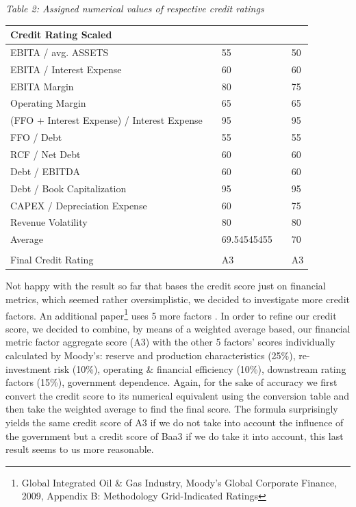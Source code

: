 \documentclass[
]{article}
\begin{document}
\emph{Table 2: Assigned numerical values of respective credit ratings}

\begin{longtable}[]{@{}lllll@{}}
\toprule
Credit Rating Scaled & & & & \\
\midrule
\endhead
EBITA / avg. ASSETS & & 55 & & 50 \\
EBITA / Interest Expense & & 60 & & 60 \\
EBITA Margin & & 80 & & 75 \\
Operating Margin & & 65 & & 65 \\
(FFO + Interest Expense) / Interest Expense & & 95 & & 95 \\
FFO / Debt & & 55 & & 55 \\
RCF / Net Debt & & 60 & & 60 \\
Debt / EBITDA & & 60 & & 60 \\
Debt / Book Capitalization & & 95 & & 95 \\
CAPEX / Depreciation Expense & & 60 & & 75 \\
Revenue Volatility & & 80 & & 80 \\
Average & & 69.54545455 & & 70 \\
& & & & \\
Final Credit Rating & & A3 & & A3 \\
\bottomrule
\end{longtable}

Not happy with the result so far that bases the credit score just on
financial metrics, which seemed rather oversimplistic, we decided to
investigate more credit factors. An additional paper\footnote{Global
  Integrated Oil \& Gas Industry, Moody's Global Corporate Finance,
  2009, Appendix B: Methodology Grid-Indicated Ratings} uses 5 more
factors . In order to refine our credit score, we decided to combine, by
means of a weighted average based, our financial metric factor aggregate
score (A3) with the other 5 factors' scores individually calculated by
Moody's: reserve and production characteristics (25\%), re-investment
risk (10\%), operating \& financial efficiency (10\%), downstream rating
factors (15\%), government dependence. Again, for the sake of accuracy
we first convert the credit score to its numerical equivalent using the
conversion table and then take the weighted average to find the final
score. The formula surprisingly yields the same credit score of A3 if we
do not take into account the influence of the government but a credit
score of Baa3 if we do take it into account, this last result seems to
us more reasonable.
\end{document}
